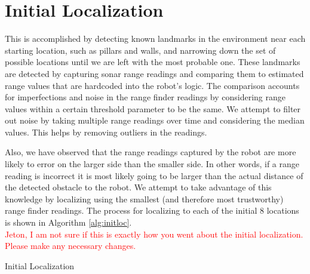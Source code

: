 \documentclass[12pt]{article}
\begin{document}
\section{Initial Localization}

This is accomplished by detecting known landmarks in the environment near each starting location, such as pillars and walls, and narrowing down the set of possible locations until we are left with the most probable one. These landmarks are detected by capturing sonar range readings and comparing them to estimated range values that are hardcoded into the robot's logic. The comparison accounts for imperfections and noise in the range finder readings by considering range values within a certain threshold parameter to be the same. We attempt to filter out noise by taking multiple range readings over time and considering the median values. This helps by removing outliers in the readings. 

Also, we have observed that the range readings captured by the robot are more likely to error on the larger side than the smaller side. In other words, if a range reading is incorrect it is most likely going to be larger than the actual distance of the detected obstacle to the robot. We attempt to take advantage of this knowledge by localizing using the smallest (and therefore most trustworthy) range finder readings. The process for localizing to each of the initial 8 locations is shown in Algorithm \ref{alg:initloc}. \\

\textcolor{red}{Jeton, I am not sure if this is exactly how you went about the initial localization. Please make any necessary changes.}


\begin{algorithm}[H]
\caption{Initial Localization}
\label{alg:initloc}
\begin{algorithmic}[1]

\ELSE 
	\ELSE
			\ELSE
			\ENDIF
		\ELSE
			\ELSE
				\ELSE 
				\ENDIF
			\ENDIF
		\ENDIF
	\ENDIF
\ENDIF

\end{algorithmic}
\end{algorithm}
\end{document}
